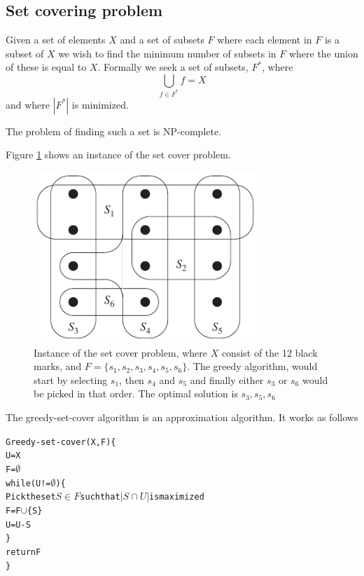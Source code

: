 \documentclass[10pt]{article}
\begin{document}
\subsection{Set covering problem} %
\label{sub:set_covering_problem}
Given a set of elements $X$ and a set of subsets $F$ where each element in $F$ is a subset of $X$ we wish to find the minimum number of subsets in $F$ where the union of these is equal to $X$. Formally we seek a set of subsets, $F^*$, where
\begin{equation}
\bigcup_{f \in F^*} f= X
\end{equation}
and where $|F^*|$ is minimized.

The problem of finding such a set is NP-complete.

Figure \ref{fig15} shows an instance of the set cover problem.

\begin{figure}[ht]
\centering
\includegraphics[width=0.75\textwidth]{figures/fig15.pdf}
\caption{Instance of the set cover problem, where $X$ consist of the 12 black marks, and $F = \{s_1, s_2, s_3, s_4, s_5, s_6\}$. The greedy algorithm, would start by selecting $s_1$, then $s_4$ and $s_5$ and finally either $s_3$ or $s_6$ would be picked in that order. The optimal solution is $s_3, s_5, s_6$}
\label{fig15}
\end{figure}

The greedy-set-cover algorithm is an approximation algorithm. It works as follows 
\begin{alltt}
Greedy-set-cover(X,F)\{
  U = X
  F = \(\emptyset\)
  while(U != \( \emptyset \))\{
    Pick the set \(S \in F\) such that \( | S \cap U | \) is maximized
    F = F \(\cup\) \{S\}
    U = U - S
  \}
  return F  
\}
\end{alltt}
\end{document}

